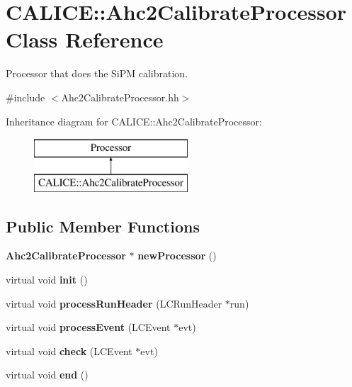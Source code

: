 \section{C\-A\-L\-I\-C\-E\-:\-:Ahc2\-Calibrate\-Processor Class Reference}
\label{classCALICE_1_1Ahc2CalibrateProcessor}


Processor that does the Si\-P\-M calibration.  




{\ttfamily \#include $<$Ahc2\-Calibrate\-Processor.\-hh$>$}

Inheritance diagram for C\-A\-L\-I\-C\-E\-:\-:Ahc2\-Calibrate\-Processor\-:\begin{figure}[H]
\begin{center}
\leavevmode
\includegraphics[height=2.000000cm]{classCALICE_1_1Ahc2CalibrateProcessor}
\end{center}
\end{figure}
\subsection*{Public Member Functions}
\begin{DoxyCompactItemize}
\item 
{\bf Ahc2\-Calibrate\-Processor} $\ast$ {\bfseries new\-Processor} ()\label{classCALICE_1_1Ahc2CalibrateProcessor_a57d619e6f0986ae6a02cbced83acc6f5}

\item 
virtual void {\bfseries init} ()\label{classCALICE_1_1Ahc2CalibrateProcessor_ad821f0bc1b0bd316e93eba7a24b7a723}

\item 
virtual void {\bfseries process\-Run\-Header} (L\-C\-Run\-Header $\ast$run)\label{classCALICE_1_1Ahc2CalibrateProcessor_ab1633c8a20a474042b7e2925276921c3}

\item 
virtual void {\bfseries process\-Event} (L\-C\-Event $\ast$evt)\label{classCALICE_1_1Ahc2CalibrateProcessor_a95d7418cc0c13b2e941f64bc222fb8b6}

\item 
virtual void {\bfseries check} (L\-C\-Event $\ast$evt)\label{classCALICE_1_1Ahc2CalibrateProcessor_a95b2468cd5bfb6ef37e3f4b4c08c2c68}

\item 
virtual void {\bfseries end} ()\label{classCALICE_1_1Ahc2CalibrateProcessor_a74e9e535f35082ecc9d311ce036324c4}

\end{DoxyCompactItemize}
